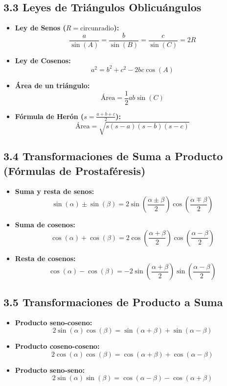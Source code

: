 \documentclass[11pt,a4paper]{article}
\begin{document}
\subsection*{3.3 Leyes de Triángulos Oblicuángulos}

\begin{itemize}
  \item \textbf{Ley de Senos ($R = \text{circunradio}$):}
  \[
    \frac{a}{\sin(A)} = \frac{b}{\sin(B)} = \frac{c}{\sin(C)} = 2R
  \]
  \item \textbf{Ley de Cosenos:}
  \[
    a^2 = b^2 + c^2 - 2bc \cos(A)
  \]
  \item \textbf{Área de un triángulo:}
  \[
    \text{Área} = \frac{1}{2} a b \sin(C)
  \]
  \item \textbf{Fórmula de Herón ($s = \frac{a + b + c}{2}$):}
  \[
    \text{Área} = \sqrt{s(s - a)(s - b)(s - c)}
  \]
\end{itemize}

\subsection*{3.4 Transformaciones de Suma a Producto (Fórmulas de Prostaféresis)}

\begin{itemize}
  \item \textbf{Suma y resta de senos:}
  \[
    \sin(\alpha) \pm \sin(\beta) = 2 \sin\left(\frac{\alpha \pm \beta}{2}\right) \cos\left(\frac{\alpha \mp \beta}{2}\right)
  \]
  \item \textbf{Suma de cosenos:}
  \[
    \cos(\alpha) + \cos(\beta) = 2 \cos\left(\frac{\alpha + \beta}{2}\right) \cos\left(\frac{\alpha - \beta}{2}\right)
  \]
  \item \textbf{Resta de cosenos:}
  \[
    \cos(\alpha) - \cos(\beta) = -2 \sin\left(\frac{\alpha + \beta}{2}\right) \sin\left(\frac{\alpha - \beta}{2}\right)
  \]
\end{itemize}

\subsection*{3.5 Transformaciones de Producto a Suma}

\begin{itemize}
  \item \textbf{Producto seno-coseno:}
  \[
    2\sin(\alpha)\cos(\beta) = \sin(\alpha + \beta) + \sin(\alpha - \beta)
  \]
  \item \textbf{Producto coseno-coseno:}
  \[
    2\cos(\alpha)\cos(\beta) = \cos(\alpha + \beta) + \cos(\alpha - \beta)
  \]
  \item \textbf{Producto seno-seno:}
  \[
    2\sin(\alpha)\sin(\beta) = \cos(\alpha - \beta) - \cos(\alpha + \beta)
  \]
\end{itemize}
\end{document}
